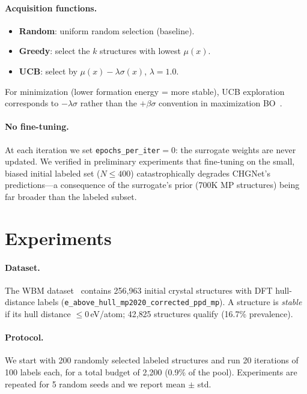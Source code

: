 \documentclass{article}
\begin{document}
\paragraph{Acquisition functions.}
\begin{itemize}
  \item \textbf{Random}: uniform random selection (baseline).
  \item \textbf{Greedy}: select the $k$ structures with lowest $\mu(x)$.
  \item \textbf{UCB}: select by $\mu(x) - \lambda\sigma(x)$, $\lambda{=}1.0$.
\end{itemize}
For minimization (lower formation energy = more stable), UCB exploration
corresponds to $-\lambda\sigma$ rather than the $+\beta\sigma$ convention in
maximization BO~\cite{auer2002using}.

\paragraph{No fine-tuning.}
At each iteration we set \texttt{epochs\_per\_iter}$=0$: the surrogate weights
are never updated.  We verified in preliminary experiments that fine-tuning on
the small, biased initial labeled set ($N \le 400$) catastrophically degrades
CHGNet's predictions---a consequence of the surrogate's prior (700K MP
structures) being far broader than the labeled subset.

\section{Experiments}

\paragraph{Dataset.}
The WBM dataset~\cite{riebesell2024matbench} contains 256{,}963 initial crystal
structures with DFT hull-distance labels
(\texttt{e\_above\_hull\_mp2020\_corrected\_ppd\_mp}).
A structure is \emph{stable} if its hull distance $\le 0$\,eV/atom; 42{,}825
structures qualify (16.7\% prevalence).

\paragraph{Protocol.}
We start with 200 randomly selected labeled structures and run 20 iterations of
100 labels each, for a total budget of 2{,}200 (0.9\% of the pool).
Experiments are repeated for 5 random seeds and we report mean $\pm$ std.
\end{document}
